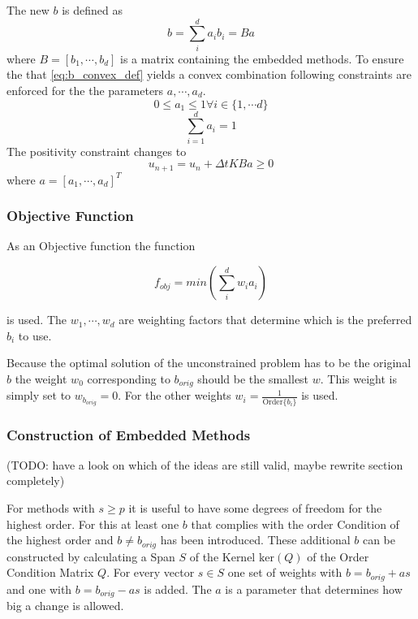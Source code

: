 \documentclass[a4paper]{scrartcl}
\numberwithin{equation}{section}
\theoremstyle{plain}
\theoremstyle{definition}
\numberwithin{theorem}{section}
\newcommand{\dt}{{\Delta t}}
\newcommand{\1}{\mathbbm{1}}
\begin{document}
The new $b$ is defined as 
\begin{equation}\label{eq:b_convex_def}
b = \sum_i^d a_i b_i = Ba
\end{equation}
where $B=\left[b_1,\cdots,b_d \right]$ is a matrix containing the embedded methods.  
To ensure the that \eqref{eq:b_convex_def} yields a convex combination following constraints are enforced for the  the parameters $a,\cdots,a_d$.
\begin{equation}
 0 \leq a_1 \leq 1  \forall {i \in \{1, \cdots d \}}
\end{equation}
\begin{equation}
 \sum_{i=1}^d a_i = 1
\end{equation}
The positivity constraint changes to 
$$u_{n+1}=u_n+\dt K B a \geq 0$$
where $a = [a_1,\cdots,a_d]^T$

\subsubsection{Objective Function}

As an Objective function the function

\begin{equation}
f_{obj} = min \left(\sum_i^d w_i a_i \right)
\end{equation}

is used.  The $w_1,\cdots,w_d$ are weighting factors that determine which is the preferred $b_i$ to use.

Because the optimal solution of the unconstrained problem has to be the original $b$ the weight $w_0$ corresponding to $b_{orig}$ should be the smallest $w$. This weight is simply set to $w_{b_{orig}} = 0$. For the other weights $w_i = \frac{1}{\mathrm{Order} \{b_i\}}$ is used.

\subsubsection{Construction of Embedded Methods}
(TODO: have a look on which of the ideas are still valid, maybe rewrite section completely)

For methods with $s \geq p$ it is useful to have some degrees of freedom for the highest order. For this at least one $b$ that complies with the order Condition of the highest order and $b \neq b_{orig}$ has been introduced.
These additional $b$ can be constructed by calculating a Span $S$ of the Kernel $\mathrm{ker} (Q)$ of the Order Condition Matrix $Q$. For every vector $s \in S$ one set of weights with $b = b_{orig} + a s$ and one with $b = b_{orig} - a s$ is added. The $a$ is a parameter that determines how big a change is allowed. 
\end{document}
